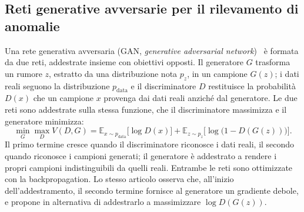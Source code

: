 \subsection{Reti generative avversarie per il rilevamento di anomalie}
\label{sec:rw-gan}

Una rete generativa avversaria (GAN, \emph{generative adversarial network})~\cite{goodfellow2014gan} è formata da due reti, addestrate insieme con obiettivi opposti. Il generatore $G$ trasforma un rumore $z$, estratto da una distribuzione nota $p_z$, in un campione $G(z)$; i dati reali seguono la distribuzione $p_{\mathrm{data}}$ e il discriminatore $D$ restituisce la probabilità $D(x)$ che un campione $x$ provenga dai dati reali anziché dal generatore. Le due reti sono addestrate sulla stessa funzione, che il discriminatore massimizza e il generatore minimizza:
\begin{equation}
    \min_G \max_D V(D,G) = \mathbb{E}_{x\sim p_{\mathrm{data}}}\bigl[\log D(x)\bigr] + \mathbb{E}_{z\sim p_z}\bigl[\log\bigl(1-D(G(z))\bigr)\bigr].
    \label{eq:gan-minimax}
\end{equation}
Il primo termine cresce quando il discriminatore riconosce i dati reali, il secondo quando riconosce i campioni generati; il generatore è addestrato a rendere i propri campioni indistinguibili da quelli reali. Entrambe le reti sono ottimizzate con la backpropagation. Lo stesso articolo osserva che, all'inizio dell'addestramento, il secondo termine fornisce al generatore un gradiente debole, e propone in alternativa di addestrarlo a massimizzare $\log D(G(z))$.

